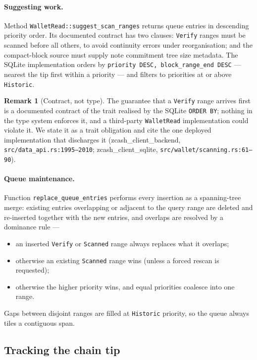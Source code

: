 \documentclass[11pt,a4paper]{article}
\theoremstyle{definition}
\newtheorem{remark}[theorem]{Remark}
\begin{document}
\paragraph{Suggesting work.} Method \texttt{WalletRead::suggest\_scan\_ranges}
returns queue entries in descending priority order. Its documented contract
has two clauses: \texttt{Verify} ranges must be scanned before all others,
to avoid continuity errors under reorganisation; and the compact-block
source must supply note commitment tree size metadata. The
SQLite
implementation orders by \texttt{priority DESC, block\_range\_end DESC} ---
nearest the tip first within a priority --- and filters to priorities at or
above \texttt{Historic}.

\begin{remark}[Contract, not type]\label{rem:sync-verify-first}
The guarantee that a \texttt{Verify} range arrives first is a documented
contract of the trait realised by the SQLite \texttt{ORDER BY}; nothing in
the type system enforces it, and a third-party \texttt{WalletRead}
implementation could violate it. We state it as a trait obligation and cite
the one deployed implementation that discharges it
(\textsf{zcash\_client\_backend}, \texttt{src/data\_api.rs:1995--2010};
\textsf{zcash\_client\_sqlite}, \texttt{src/wallet/scanning.rs:61--90}).
\end{remark}

\paragraph{Queue maintenance.} Function \texttt{replace\_queue\_entries}
performs every insertion as a spanning-tree merge: existing entries
overlapping or adjacent to the query range are deleted and re-inserted
together with the new entries, and overlaps are resolved by a dominance
rule ---
\begin{itemize}
\item an inserted \texttt{Verify} or \texttt{Scanned} range always replaces
  what it overlaps;
\item otherwise an existing \texttt{Scanned} range wins (unless a forced
  rescan is requested);
\item otherwise the higher priority wins, and equal priorities coalesce
  into one range.
\end{itemize}
Gaps between disjoint ranges are filled at \texttt{Historic} priority, so
the queue always tiles a contiguous span.

\subsection{Tracking the chain tip}\label{sec:sync-tip}
\end{document}
